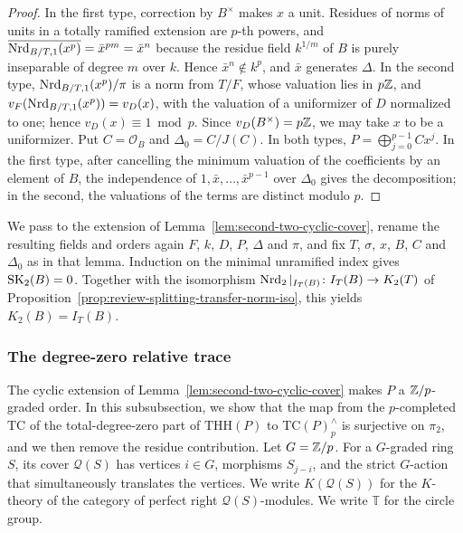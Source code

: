 \begin{proof}
In the first type, correction by $B^\times$ makes $x$ a unit.
Residues of norms of units in a totally ramified extension are $p$-th powers, and $\overline{\operatorname{Nrd}_{B/T,1}(x^p)}=\bar x^{pm}=\bar x^n$ because the residue field $k^{1/m}$ of $B$ is purely inseparable of degree $m$ over $k$.
Hence $\bar x^n\notin k^p$, and $\bar x$ generates $\Delta$.
In the second type, $\operatorname{Nrd}_{B/T,1}(x^p)/\pi$ is a norm from $T/F$, whose valuation lies in $p\mathbb Z$, and $v_F(\operatorname{Nrd}_{B/T,1}(x^p))=v_D(x)$, with the valuation of a uniformizer of $D$ normalized to one; hence $v_D(x)\equiv1\bmod p$.
Since $v_D(B^\times)=p\mathbb Z$, we may take $x$ to be a uniformizer.
Put $C=\mathcal O_B$ and $\Delta_0=C/J(C)$.
In both types, $P=\bigoplus_{j=0}^{p-1} Cx^j$.
In the first type, after cancelling the minimum valuation of the coefficients by an element of $B$, the independence of $1,\bar x,\ldots,\bar x^{p-1}$ over $\Delta_0$ gives the decomposition; in the second, the valuations of the terms are distinct modulo $p$.
\end{proof}

We pass to the extension of Lemma~\ref{lem:second-two-cyclic-cover}, rename the resulting fields and orders again $F$, $k$, $D$, $P$, $\Delta$ and $\pi$, and fix $T$, $\sigma$, $x$, $B$, $C$ and $\Delta_0$ as in that lemma.
Induction on the minimal unramified index gives $\operatorname{SK}_2(B)=0$.
Together with the isomorphism $\operatorname{Nrd}_2|_{I_T(B)}\colon I_T(B)\to K_2(T)$ of Proposition~\ref{prop:review-splitting-transfer-norm-iso}, this yields $K_2(B)=I_T(B)$.

\subsubsection{The degree-zero relative trace}
The cyclic extension of Lemma~\ref{lem:second-two-cyclic-cover} makes $P$ a $\mathbb Z/p$-graded order.
In this subsubsection, we show that the map from the $p$-completed $\mathrm{TC}$ of the total-degree-zero part of $\mathrm{THH}(P)$ to $\mathrm{TC}(P)^\wedge_p$ is surjective on $\pi_2$, and we then remove the residue contribution.
Let $G=\mathbb Z/p$.
For a $G$-graded ring $S$, its cover $\mathcal Q(S)$ has vertices $i\in G$, morphisms $S_{j-i}$, and the strict $G$-action that simultaneously translates the vertices.
We write $K(\mathcal Q(S))$ for the $K$-theory of the category of perfect right $\mathcal Q(S)$-modules.
We write $\mathbb T$ for the circle group.

